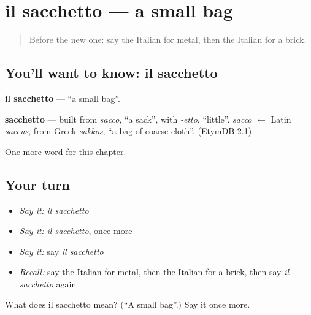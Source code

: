 \section[il sacchetto]{il sacchetto — a small bag}

\label{lesson:IT-C257-sacchetto}



\begin{quote}
Before the new one: say the Italian for metal, then the Italian for a brick.
\end{quote}

\subsection*{You'll want to know: il sacchetto}
\textbf{il sacchetto} — \textquotedblleft{}a small bag\textquotedblright{}.

\begin{cousinweb}
\textbf{sacchetto} — built from \emph{sacco}, \textquotedblleft{}a sack\textquotedblright{}, with \emph{-etto}, \textquotedblleft{}little\textquotedblright{}. \emph{sacco} $\leftarrow$ Latin \emph{saccus}, from Greek \emph{sakkos}, \textquotedblleft{}a bag of coarse cloth\textquotedblright{}. (EtymDB 2.1)
\end{cousinweb}

\begin{grammarlens}[title={What you've built}]
One more word for this chapter.
\end{grammarlens}

\subsection*{Your turn}
\begin{itemize}
\raggedright
  \item \emph{Say it:} \emph{il sacchetto}
  \item \emph{Say it:} \emph{il sacchetto}, once more
  \item \emph{Say it:} say \emph{il sacchetto}
  \item \emph{Recall:} say the Italian for metal, then the Italian for a brick, then say \emph{il sacchetto} again
\end{itemize}

\begin{tcolorbox}[breakable,colback=teal!4,colframe=teal!35!black,title={Before you move on}]
What does il sacchetto mean? (\textquotedblleft{}A small bag\textquotedblright{}.) Say it once more.
\end{tcolorbox}
